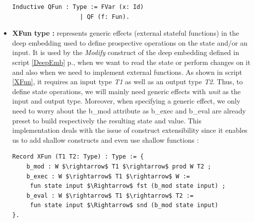 \begin{itemize}
\begin{lstlisting}[caption = {Quasi-functions in the deep embedding},xleftmargin=.08\textwidth,
xrightmargin=.14\textwidth]
Inductive QFun : Type := FVar (x: Id) 
	               | QF (f: Fun).
\end{lstlisting}
	\item \textbf{XFun type :} represents generic effects (external stateful functions) in the deep embedding used to define prospective operations on the state and/or an input. It is used by the \textit{Modify} construct of the deep embedding defined in script \ref{DeepEmb} p.\pageref{DeepEmb}, when we want to read the state or perform changes on it and also when we need to implement external functions. As shown in script \ref{XFun}, it requires an input type \textit{T1} as well as an output type \textit{T2}. Thus, to define state operations, we will mainly need generic effects with \textit{unit} as the input and output type. Moreover, when specifying a generic effect, we only need to worry about the b\_mod attribute as b\_exec and b\_eval are already preset to build respectively the resulting state and value. This implementation deals with the issue of construct extensibility since it enables us to add shallow constructs and even use shallow functions :
\begin{lstlisting}[caption = {generic effects in the deep embedding}, label={XFun}, mathescape=true,xleftmargin=.02\textwidth,
xrightmargin=.02\textwidth]
Record XFun (T1 T2: Type) : Type := {
    b_mod : W $\rightarrow$ T1 $\rightarrow$ prod W T2 ;
    b_exec : W $\rightarrow$ T1 $\rightarrow$ W := 
     fun state input $\Rightarrow$ fst (b_mod state input) ;
    b_eval : W $\rightarrow$ T1 $\rightarrow$ T2 := 
     fun state input $\Rightarrow$ snd (b_mod state input) 
}.       
\end{lstlisting}
\end{itemize}


